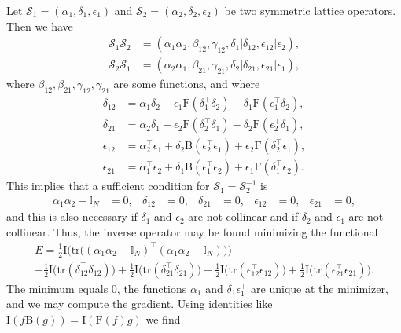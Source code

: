 \documentclass[12pt,a4paper]{article}
\newcommand{\Sop}{\mathcal{S}}
\begin{document}
Let $\Sop_1 = (\alpha_1,\delta_1,\epsilon_1)$ and $\Sop_2 = (\alpha_2,\delta_2,\epsilon_2)$ be two symmetric lattice operators. Then we have
\begin{align*}
\Sop_1 \Sop_2 &= (\alpha_1 \alpha_2, \beta_{12}, \gamma_{12}, \delta_1 \vert \delta_{12}, \epsilon_{12} \vert \epsilon_2), \\
\Sop_2 \Sop_1 &= (\alpha_2 \alpha_1, \beta_{21}, \gamma_{21}, \delta_2 \vert \delta_{21}, \epsilon_{21} \vert \epsilon_1),
\end{align*}
where $\beta_{12}, \beta_{21}, \gamma_{12}, \gamma_{21}$ are some functions, and where
\begin{align*}
\delta_{12} &= \alpha_1 \delta_2 + \epsilon_1 \mathrm{F}(\delta_1^\top \delta_2) - \delta_1 \mathrm{F}(\epsilon_1^\top \delta_2), \\
\delta_{21} &= \alpha_2 \delta_1 + \epsilon_2 \mathrm{F}(\delta_2^\top \delta_1) - \delta_2 \mathrm{F}(\epsilon_2^\top \delta_1), \\
\epsilon_{12} &= \alpha_2^\top \epsilon_1 + \delta_2 \mathrm{B}(\epsilon_2^\top \epsilon_1) + \epsilon_2 \mathrm{F}(\delta_2^\top \epsilon_1), \\
\epsilon_{21} &= \alpha_1^\top \epsilon_2 + \delta_1 \mathrm{B}(\epsilon_1^\top \epsilon_2) + \epsilon_1 \mathrm{F}(\delta_1^\top \epsilon_2).
\end{align*}
This implies that a sufficient condition for $\Sop_1 = \Sop_2^{-1}$ is
\begin{align*}
\alpha_1 \alpha_2 - \mathbb{I}_N &= 0, & \delta_{12} &= 0, & \delta_{21} &= 0, & \epsilon_{12} &= 0, & \epsilon_{21} &= 0,
\end{align*}
and this is also necessary if $\delta_1$ and $\epsilon_2$ are not collinear and if $\delta_2$ and $\epsilon_1$ are not collinear. Thus, the inverse operator may be found minimizing the functional
\begin{multline*}
E = \tfrac{1}{2} \mathrm{I}\big( \text{tr}\big( (\alpha_1\alpha_2 - \mathbb{I}_N)^\top (\alpha_1\alpha_2 - \mathbb{I}_N) \big) \big) \\
+ \tfrac{1}{2} \mathrm{I}\big( \text{tr}(\delta_{12}^\top \delta_{12}) \big) 
+ \tfrac{1}{2} \mathrm{I}\big( \text{tr}(\delta_{21}^\top \delta_{21}) \big) 
+ \tfrac{1}{2} \mathrm{I}\big( \text{tr}(\epsilon_{12}^\top \epsilon_{12}) \big) 
+ \tfrac{1}{2} \mathrm{I}\big( \text{tr}(\epsilon_{21}^\top \epsilon_{21}) \big). 
\end{multline*}
The minimum equals 0, the functions $\alpha_1$ and $\delta_1 \epsilon_1^\top$ are unique at the minimizer, and we may compute the gradient. Using identities like $\mathrm{I}(f \mathrm{B}(g)) = \mathrm{I}(\mathrm{F}(f) g)$ we find
\end{document}
